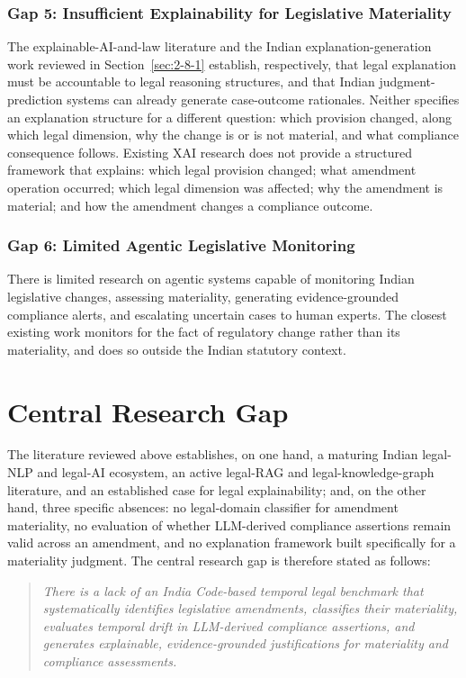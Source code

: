 \subsubsection{Gap 5: Insufficient Explainability for Legislative Materiality}

The explainable-AI-and-law literature \cite{richmond2024xaisurvey,collenette2023ecthr} and the Indian explanation-generation work reviewed in Section~\ref{sec:2-8-1} \cite{nigam2025tathyanyaya} establish, respectively, that legal explanation must be accountable to legal reasoning structures, and that Indian judgment-prediction systems can already generate case-outcome rationales. Neither specifies an explanation structure for a different question: which provision changed, along which legal dimension, why the change is or is not material, and what compliance consequence follows. Existing XAI research does not provide a structured framework that explains: which legal provision changed; what amendment operation occurred; which legal dimension was affected; why the amendment is material; and how the amendment changes a compliance outcome.

\subsubsection{Gap 6: Limited Agentic Legislative Monitoring}

There is limited research on agentic systems capable of monitoring Indian legislative changes, assessing materiality, generating evidence-grounded compliance alerts, and escalating uncertain cases to human experts. The closest existing work \cite{bonatti2020pronto,li2025regtech,hassani2024llmcompliance} monitors for the fact of regulatory change rather than its materiality, and does so outside the Indian statutory context.

\section{Central Research Gap}

\label{sec:2-13}

The literature reviewed above establishes, on one hand, a maturing Indian legal-NLP and legal-AI ecosystem, an active legal-RAG and legal-knowledge-graph literature, and an established case for legal explainability; and, on the other hand, three specific absences: no legal-domain classifier for amendment materiality, no evaluation of whether LLM-derived compliance assertions remain valid across an amendment, and no explanation framework built specifically for a materiality judgment. The central research gap is therefore stated as follows:

\begin{quote}\itshape There is a lack of an India Code-based temporal legal benchmark that systematically identifies legislative amendments, classifies their materiality, evaluates temporal drift in LLM-derived compliance assertions, and generates explainable, evidence-grounded justifications for materiality and compliance assessments.\end{quote}